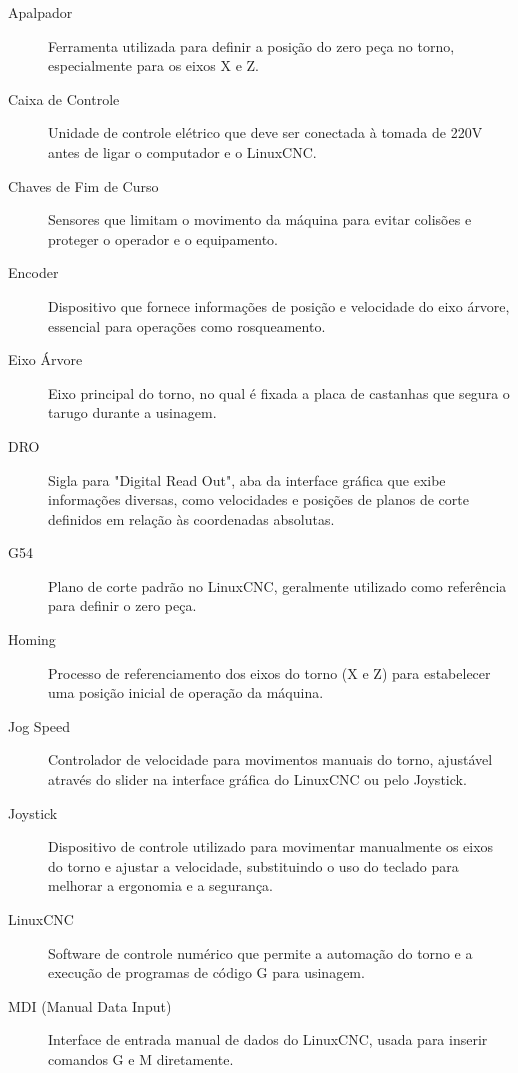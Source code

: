 \documentclass[twoside,a4paper]{refart}
\begin{document}
\begin{description}
	\item[Apalpador] Ferramenta utilizada para definir a posição do zero peça no torno, especialmente para os eixos X e Z.
	
	\item[Caixa de Controle] Unidade de controle elétrico que deve ser conectada à tomada de 220V antes de ligar o computador e o LinuxCNC.
	
	\item[Chaves de Fim de Curso] Sensores que limitam o movimento da máquina para evitar colisões e proteger o operador e o equipamento.
	
	\item[Encoder] Dispositivo que fornece informações de posição e velocidade do eixo árvore, essencial para operações como rosqueamento.
	
	\item[Eixo Árvore] Eixo principal do torno, no qual é fixada a placa de castanhas que segura o tarugo durante a usinagem.

    \item[DRO] Sigla para "Digital Read Out", aba da interface gráfica que exibe informações diversas, como velocidades e posições de planos de corte definidos em relação às coordenadas absolutas.

	\item[G54] Plano de corte padrão no LinuxCNC, geralmente utilizado como referência para definir o zero peça.
	
	\item[Homing] Processo de referenciamento dos eixos do torno (X e Z) para estabelecer uma posição inicial de operação da máquina.
	
	\item[Jog Speed] Controlador de velocidade para movimentos manuais do torno, ajustável através do slider na interface gráfica do LinuxCNC ou pelo Joystick.
	
	\item[Joystick] Dispositivo de controle utilizado para movimentar manualmente os eixos do torno e ajustar a velocidade, substituindo o uso do teclado para melhorar a ergonomia e a segurança.
	
	\item[LinuxCNC] Software de controle numérico que permite a automação do torno e a execução de programas de código G para usinagem.
	
	\item[MDI (Manual Data Input)] Interface de entrada manual de dados do LinuxCNC, usada para inserir comandos G e M diretamente.
	

\end{description}
\end{document}
